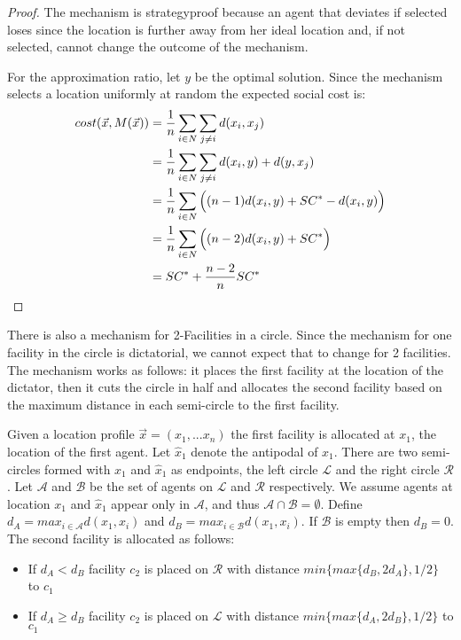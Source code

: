 \begin{proof}
The mechanism is strategyproof because an agent that deviates if selected loses since the location is further away from her ideal location and, if not selected, cannot change the outcome of the mechanism.

For the approximation ratio, let $y$ be the optimal solution. Since the mechanism selects a location uniformly at random the expected social cost is:
\begin{align*}
    cost(\vec{x},M(\vec{x})) &= \frac{1}{n} \sum_{i\in N}\sum_{j\ne i} d(x_i,x_j)  \\
    &=\frac{1}{n} \sum_{i\in N}\sum_{j\ne i} d(x_i,y)+d(y,x_j)\\
    &=\frac{1}{n} \sum_{i\in N} \Big( (n-1)d(x_i,y) + SC^*-d(x_i,y) \Big)\\
    &= \frac{1}{n}\sum_{i\in N} \Big( (n-2)d(x_i,y) + SC^* \Big)\\
    &=SC^* + \frac{n-2}{n}SC^*
\end{align*}
\end{proof}

There is also a mechanism for 2-Facilities in a circle. Since the mechanism for one facility in the circle is dictatorial, we cannot expect that to change for 2 facilities. The mechanism works as follows: it places the first facility at the location of the dictator, then it cuts the circle in half and allocates the second facility based on the maximum distance in each semi-circle to the first facility.


\begin{definition}
Given a location profile $\vec{x}=(x_1,...x_n)$ the first facility is allocated at $x_1$, the location of the first agent. Let $\hat{x}_1$ denote the antipodal of $x_1$. There are two semi-circles formed with $x_1$ and $\hat{x}_1$ as endpoints, the left circle $\mathcal{L}$ and the right circle $\mathcal{R}$. Let $\mathcal{A}$ and $\mathcal{B}$ be the set of agents on $\mathcal{L}$ and $\mathcal{R}$ respectively. We assume agents at location $x_1$ and $\hat{x}_1$  appear only in $\mathcal{A}$, and thus $\mathcal{A}\cap \mathcal{B}= \emptyset$. Define $d_A = max_{i \in \mathcal{A}} d(x_1,x_i)$ and $d_B = max_{i \in \mathcal{B}} d(x_1,x_i)$. If $\mathcal{B}$ is empty then $d_B = 0$. The second facility is allocated as follows:
\begin{itemize}
    \item If $d_A < d_B$ facility $c_2$ is placed on $\mathcal{R}$ with distance $min\{max\{ d_B, 2d_A\},1/2 \}$ to $c_1$ 
    \item If $d_A \ge d_B$ facility $c_2$ is placed on $\mathcal{L}$ with distance $min\{max\{ d_A, 2d_B\},1/2 \}$ to $c_1$
\end{itemize}
\end{definition}



